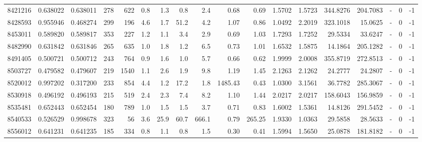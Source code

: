 \begin{tabular}{rrrrrrrrrrrrrrrlrr}
   8421216 & 0.638022 &   0.638011 &  278 &  622 &      0.8 &      1.3 &     0.8 &      2.4 &       0.68 &        0.69 &  1.5702 &  1.5723 &  344.8276 &  204.7083 &             - &        0 &         -1 \\
   8428593 & 0.955946 &   0.468274 &  299 &  196 &      4.6 &      1.7 &    51.2 &      4.2 &       1.07 &        0.86 &  1.0492 &  2.2019 &  323.1018 &   15.0625 &             - &        0 &         -1 \\
   8453011 & 0.589820 &   0.589817 &  353 &  227 &      1.2 &      1.1 &     3.4 &      2.9 &       0.69 &        1.03 &  1.7293 &  1.7252 &   29.5334 &   33.6247 &             - &        0 &         -1 \\
   8482990 & 0.631842 &   0.631846 &  265 &  635 &      1.0 &      1.8 &     1.2 &      6.5 &       0.73 &        1.01 &  1.6532 &  1.5875 &   14.1864 &  205.1282 &             - &        0 &         -1 \\
   8491405 & 0.500721 &   0.500712 &  243 &  764 &      0.9 &      1.6 &     1.0 &      5.7 &       0.66 &        0.62 &  1.9999 &  2.0008 &  355.8719 &  272.8513 &             - &        0 &         -1 \\
   8503727 & 0.479582 &   0.479607 &  219 & 1540 &      1.1 &      2.6 &     1.9 &      9.8 &       1.19 &        1.45 &  2.1263 &  2.1262 &   24.2777 &   24.2807 &             - &        0 &         -1 \\
   8520012 & 0.997202 &   0.317200 &  233 &  854 &      4.4 &      1.2 &    17.2 &      1.8 &    1485.43 &        0.43 &  1.0300 &  3.1561 &   36.7782 &  285.3067 &             - &        0 &         -1 \\
   8530918 & 0.496192 &   0.496193 &  215 &  519 &      2.4 &      2.3 &     7.4 &      8.2 &       1.10 &        1.44 &  2.0217 &  2.0217 &  158.6043 &  156.9859 &             - &        0 &         -1 \\
   8535481 & 0.652443 &   0.652454 &  180 &  789 &      1.0 &      1.5 &     1.5 &      3.7 &       0.71 &        0.83 &  1.6002 &  1.5361 &   14.8126 &  291.5452 &             - &        0 &         -1 \\
   8540533 & 0.526529 &   0.998678 &  323 &   56 &      3.6 &     25.9 &    60.7 &    666.1 &       0.79 &      265.25 &  1.9330 &  1.0363 &   29.5858 &   28.5633 &             - &        0 &         -1 \\
   8556012 & 0.641231 &   0.641235 &  185 &  334 &      0.8 &      1.1 &     0.8 &      1.5 &       0.30 &        0.41 &  1.5994 &  1.5650 &   25.0878 &  181.8182 &             - &        0 &         -1 \\

\end{tabular}
